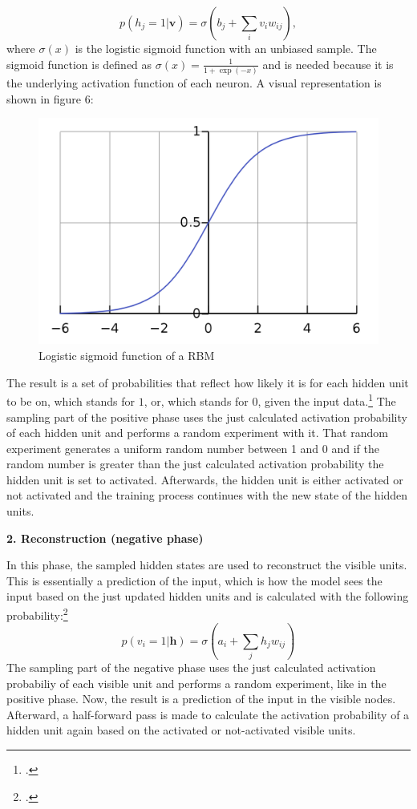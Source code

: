 \begin{equation}
p(h_j = 1 | \textbf{v}) = \sigma(b_j + \sum_i v_i w_{ij}),
\end{equation}
where $\sigma(x)$ is the logistic sigmoid function with an unbiased sample. The sigmoid function is defined as $\sigma(x) = \frac{1}{1 + \exp(-x)}$ and is needed because it is the underlying activation function of each neuron.
A visual representation is shown in figure 6:
\begin{figure}[H]
    \centering
    \includegraphics[width=0.45\linewidth]{graphics/logistic_sigmoid.png}
    \caption{Logistic sigmoid function of a RBM}
    \label{logistic_sigmoid}
\end{figure}
The result is a set of probabilities that reflect how likely it is for each hidden unit to be on, which stands for \( 1 \), or, which stands for \( 0 \), given the input data.\footcite[cf.][6]{huembeliPhysicsEnergybasedModels2022}
The sampling part of the positive phase uses the just calculated activation probability of each hidden unit and performs a random experiment with it.
That random experiment generates a uniform random number between 1 and 0 and if the random number is greater than the just calculated activation probability the hidden unit is set to activated.
Afterwards, the hidden unit is either activated or not activated and the training process continues with the new state of the hidden units.

\textbf{2. Reconstruction (negative phase)}

In this phase, the sampled hidden states are used to reconstruct the visible units. 
This is essentially a prediction of the input, which is how the model sees the input based on the just updated hidden units and is calculated with the following probability:\footcite[cf.][6]{hintonPracticalGuideTraining2012}
\begin{equation}
    p(v_i = 1 | \mathbf{h}) = \sigma(a_i + \sum_j h_j w_{ij})
\end{equation}
The sampling part of the negative phase uses the just calculated activation probabiliy
of each visible unit and performs a random experiment, like in the positive phase.
Now, the result is a prediction of the input in the visible nodes.
Afterward, a half-forward pass is made to calculate the activation probability of a hidden unit again based on the activated or not-activated visible units.

